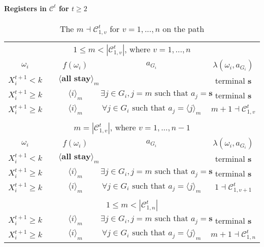 \documentclass[12pt,letter]{article}
\newcommand{\Kappa}{\mathcal{C}}
\theoremstyle{definition}
\theoremstyle{remark}
\theoremstyle{claim}
\begin{document}
\paragraph{Registers in $\Kappa^t$ for $t\geq 2$}
\clearpage
\begin{table}[!htbp]
\caption{The $m\dashv\Kappa^t_{1,v}$ for $v=1,...,n$ on the path}
\label{table:eqm_path_kt1}
\begin{center}
\begin{tabular}{c c | c | c | c}
\multicolumn{5}{c}{$1\leq m < |\Kappa^t_{1,v}|$, where $v=1,...,n$}\\
$\omega_i$ 	 & 	   &	$f(\omega_i)$  &	$a_{G_i}$ & $\lambda(\omega_i,a_{G_i})$ \\
\hline
\hline
$X^{t+1}_i<k$  	&                                & $\langle \textbf{all stay} \rangle_m$		&				 				& terminal \textbf{s}\\
$X^{t+1}_i\geq k$  	& 						& $\langle i \rangle_m$		&  $\exists j\in G_i, j=m\text{ such that } a_j=\textbf{s}$	& terminal \textbf{s}\\
$X^{t+1}_i\geq k$ 	& 						& $\langle i \rangle_m$		&  $\forall j\in G_i\text{ such that } a_j= \langle j \rangle_m$	& $m+1\dashv \Kappa^t_{1,v}$\\
\hline
\\
\multicolumn{5}{c}{$m= |\Kappa^t_{1,v}|$, where $v=1,...,n-1$}\\
$\omega_i$ 	 & 	   &	$f(\omega_i)$  &	$a_{G_i}$ & $\lambda(\omega_i,a_{G_i})$ \\
\hline
\hline
$X^{t+1}_i<k$  	&                                & $\langle \textbf{all stay} \rangle_m$	&				 				& terminal \textbf{s}\\
$X^{t+1}_i\geq k$ & 						& $\langle i \rangle_m$		&  $\exists j\in G_i, j=m\text{ such that } a_j=\textbf{s}$	& terminal \textbf{s}\\
$X^{t+1}_i\geq k$ 	& 						& $\langle i \rangle_m$		&  $\forall j\in G_i\text{ such that } a_j= \langle j \rangle_m$	& $1\dashv \Kappa^t_{1,v+1}$\\
\hline
\\
\multicolumn{5}{c}{$1\leq m < |\Kappa^t_{1,n}|$}\\
\hline
\hline
$X^{t+1}_i\geq k$ 	& 						& $\langle i \rangle_m$		&  $\exists j\in G_i, j=m\text{ such that } a_j=\textbf{s}$	& terminal \textbf{s}\\
$X^{t+1}_i\geq k$ & 						& $\langle i \rangle_m$		&  $\forall j\in G_i\text{ such that } a_j= \langle j \rangle_m$	& $m+1\dashv \Kappa^t_{1,n}$\\

\end{tabular}
\end{center}
\end{table}
\end{document}
